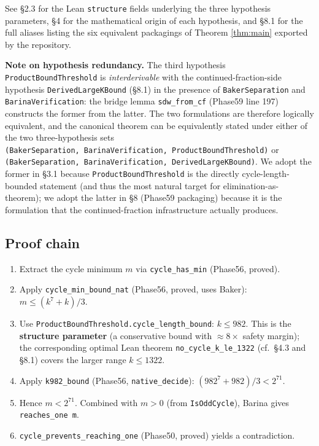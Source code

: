 \documentclass[
  11pt]{amsart}
\providecommand{\tightlist}{%
  \setlength{\itemsep}{0pt}\setlength{\parskip}{0pt}}
\theoremstyle{plain}
\theoremstyle{definition}
\theoremstyle{remark}
\begin{document}
See §2.3 for the Lean \texttt{structure} fields underlying the three
hypothesis parameters, §4 for the mathematical origin of each
hypothesis, and §8.1 for the full aliases listing the six equivalent
packagings of Theorem \ref{thm:main} exported by the repository.

\textbf{Note on hypothesis redundancy.} The third hypothesis
\texttt{ProductBoundThreshold} is \emph{interderivable} with the
continued-fraction-side hypothesis \texttt{DerivedLargeKBound} (§8.1) in
the presence of \texttt{BakerSeparation} and
\texttt{BarinaVerification}: the bridge lemma \texttt{sdw\_from\_cf}
(Phase59 line 197) constructs the former from the latter. The two
formulations are therefore logically equivalent, and the canonical
theorem can be equivalently stated under either of the two
three-hypothesis sets
\texttt{(BakerSeparation,\ BarinaVerification,\ ProductBoundThreshold)}
or \texttt{(BakerSeparation,\ BarinaVerification,\ DerivedLargeKBound)}.
We adopt the former in §3.1 because \texttt{ProductBoundThreshold} is
the directly cycle-length-bounded statement (and thus the most natural
target for elimination-as-theorem); we adopt the latter in §8 (Phase59
packaging) because it is the formulation that the continued-fraction
infrastructure actually produces.

\subsection{Proof chain}\label{proof-chain}

\begin{enumerate}
\def\labelenumi{\arabic{enumi}.}
\tightlist
\item
  Extract the cycle minimum \(m\) via \texttt{cycle\_has\_min} (Phase56,
  proved).
\item
  Apply \texttt{cycle\_min\_bound\_nat} (Phase56, proved, uses Baker):
  \(m \leq (k^7 + k) / 3\).
\item
  Use \texttt{ProductBoundThreshold.cycle\_length\_bound}:
  \(k \leq 982\). This is the \textbf{structure parameter} (a
  conservative bound with \(\approx 8\times\) safety margin); the
  corresponding optimal Lean theorem \texttt{no\_cycle\_k\_le\_1322}
  (cf.~§4.3 and §8.1) covers the larger range \(k \leq 1322\).
\item
  Apply \texttt{k982\_bound} (Phase56, \texttt{native\_decide}):
  \((982^7 + 982)/3 < 2^{71}\).
\item
  Hence \(m < 2^{71}\). Combined with \(m > 0\) (from
  \texttt{IsOddCycle}), Barina gives \texttt{reaches\_one\ m}.
\item
  \texttt{cycle\_prevents\_reaching\_one} (Phase50, proved) yields a
  contradiction.
\end{enumerate}
\end{document}

